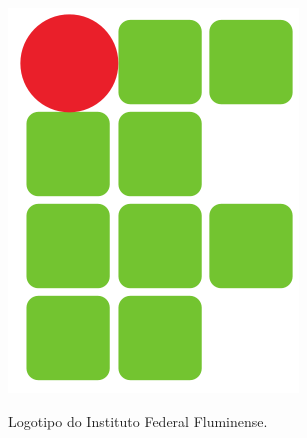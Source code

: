 \begin{figure}[ht]
    \centering
    {\includegraphics[scale=0.25]{figuras/logo_iff}}
    \caption{Logotipo do Instituto Federal Fluminense.}
    \label{img:logo_iff}
\end{figure}

